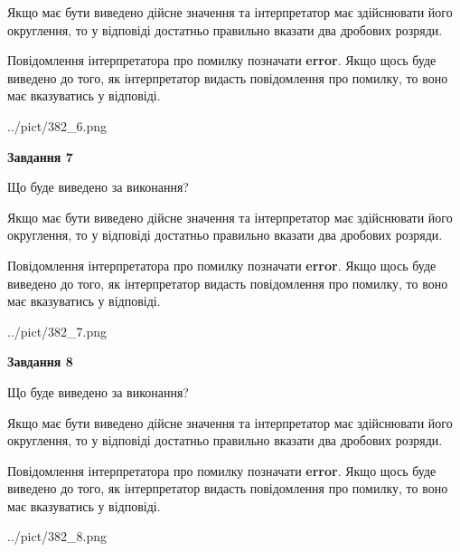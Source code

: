 \documentclass[12pt, ukrainian]{article}
\begin{document}
{\begin {Large}
Якщо має бути виведено дійсне значення та інтерпретатор має здійснювати його округлення, 
то у відповіді достатньо правильно вказати два дробових розряди.

Повідомлення інтерпретатора про помилку позначати \textbf{error}.
Якщо щось буде виведено до того, як інтерпретатор видасть повідомлення про помилку, 
то воно має вказуватись у відповіді. \par

\begin{center}
	{../pict/382_6.png}
\end{center}
\newpage

{\begin {center}\textbf{Завдання 7}\end {center}}\par
Що буде виведено за виконання? \par

Якщо має бути виведено дійсне значення та інтерпретатор має здійснювати його округлення, 
то у відповіді достатньо правильно вказати два дробових розряди.

Повідомлення інтерпретатора про помилку позначати \textbf{error}.
Якщо щось буде виведено до того, як інтерпретатор видасть повідомлення про помилку, 
то воно має вказуватись у відповіді. \par

\begin{center}
	{../pict/382_7.png}
\end{center}
\newpage

{\begin {center}\textbf{Завдання 8}\end {center}}\par
Що буде виведено за виконання? \par

Якщо має бути виведено дійсне значення та інтерпретатор має здійснювати його округлення, 
то у відповіді достатньо правильно вказати два дробових розряди.

Повідомлення інтерпретатора про помилку позначати \textbf{error}.
Якщо щось буде виведено до того, як інтерпретатор видасть повідомлення про помилку, 
то воно має вказуватись у відповіді. \par

\begin{center}
	{../pict/382_8.png}
\end{center}
\newpage


\end{Large}}
\end{document}
